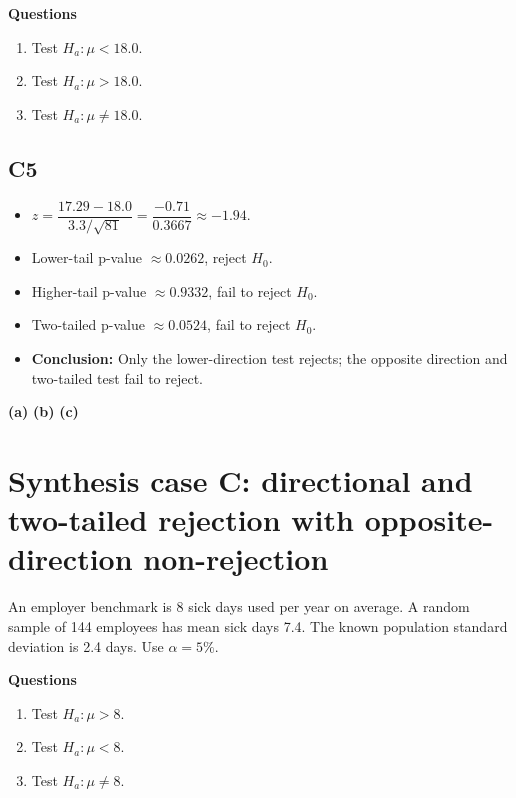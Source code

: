\textbf{Questions}
\begin{enumerate}
    \item[(a)] Test \(H_a\colon \mu<18.0\).
    \item[(b)] Test \(H_a\colon \mu>18.0\).
    \item[(c)] Test \(H_a\colon \mu\ne18.0\).
\end{enumerate}

\subsection*{C5}
\begin{itemize}
    \item \(z=\dfrac{17.29-18.0}{3.3/\sqrt{81}}=\dfrac{-0.71}{0.3667}\approx-1.94\).
    \item Lower-tail p-value \(\approx0.0262\), reject \(H_0\).
    \item Higher-tail p-value \(\approx0.9332\), fail to reject \(H_0\).
    \item Two-tailed p-value \(\approx0.0524\), fail to reject \(H_0\).
    \item \textbf{Conclusion:} Only the lower-direction test rejects; the opposite direction and two-tailed test fail to reject.
\end{itemize}

\begin{center}
\textbf{(a)}\;
\hspace{0.5cm}
\textbf{(b)}\;
\hspace{0.5cm}
\textbf{(c)}\;
\end{center}


\section{Synthesis case C: directional and two-tailed rejection with opposite-direction non-rejection}
An employer benchmark is 8 sick days used per year on average. A random sample of 144 employees has mean sick days 7.4. The known population standard deviation is 2.4 days. Use \(\alpha=5\%\).

\textbf{Questions}
\begin{enumerate}
    \item[(a)] Test \(H_a\colon \mu>8\).
    \item[(b)] Test \(H_a\colon \mu<8\).
    \item[(c)] Test \(H_a\colon \mu\ne8\).
\end{enumerate}

